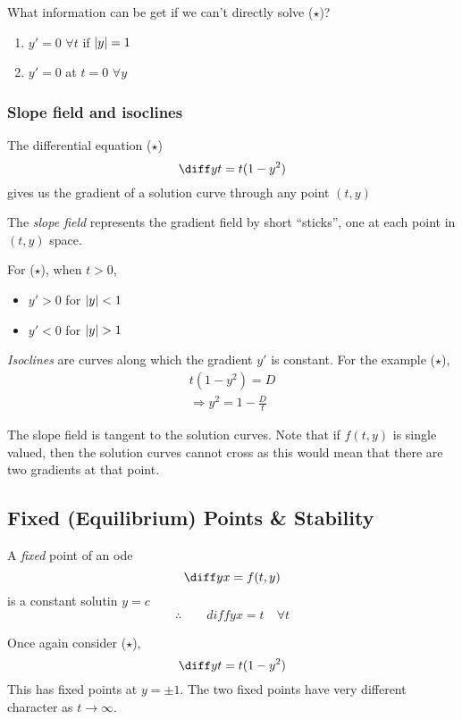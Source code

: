 \documentclass{article}
\begin{document}
\begin{remark}
    What information can be get if we can't directly solve ($\star$)?
    \begin{enumerate}
        \item $y' = 0$ $\forall t$ if $\left\lvert y\right\rvert = 1$
        \item $y' = 0$ at $t = 0$ $\forall y$
    \end{enumerate}
\end{remark}

\subsubsection{Slope field and isoclines}
The differential equation ($\star$)
\[
    \diff yt = t(1 - y^2)
\]
gives us the gradient of a solution curve through any point $(t, y)$

\begin{defi}
    The \emph{slope field} represents the gradient field by short ``sticks'', one at each point in $(t, y)$ space.
\end{defi}
\begin{eg}
    For ($\star$), when $t > 0$,
    \begin{itemize}
        \item $y' > 0$ for $\left\lvert y\right\rvert < 1$
        \item $y' < 0$ for $\left\lvert y\right\rvert > 1$
    \end{itemize} 
\end{eg}

\begin{defi}[Isoclines]
    \emph{Isoclines} are curves along which the gradient $y'$ is constant.
    For the example ($\star$), 
    \begin{align*}
        t(1-y^2) = D \\
        \Rightarrow y^2 = 1 - \frac{D}{t}
    \end{align*}
\end{defi}
\begin{remark}
    The slope field is tangent to the solution curves.
    Note that if $f(t, y)$ is single valued, then the solution curves cannot cross as this would mean that there are two gradients at that point.
\end{remark}

\subsection{Fixed (Equilibrium) Points \& Stability}
\begin{defi}
    A \emph{fixed} point of an ode
    \[
        \diff yx = f(t,y)   
    \]
    is a constant solutin $y = c$
    \[
        \therefore \qquad diff yx = t \quad \forall t  
    \]
\end{defi}
\begin{eg}
    Once again consider ($\star$),
    \[
        \diff yt = t(1 - y^2)  
    \]
    This has fixed points at $y = \pm 1$.
    The two fixed points have very different character as $t \rightarrow \infty$.
\end{eg}
\end{document}
